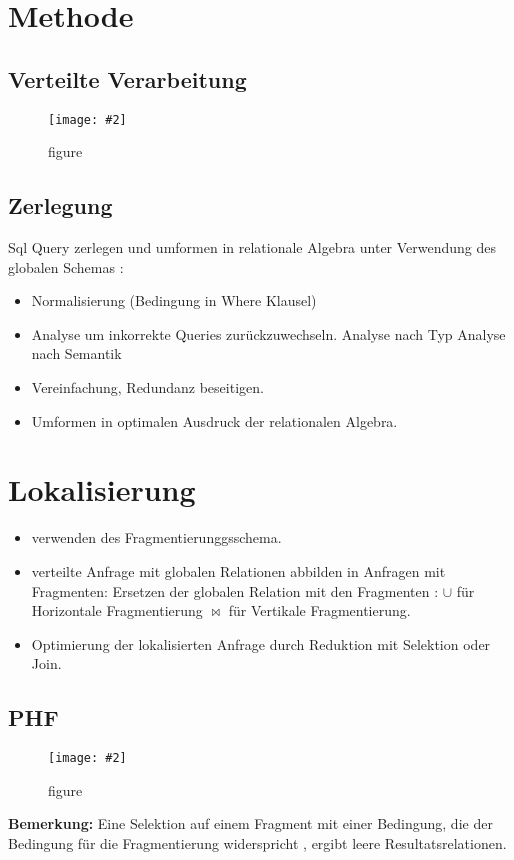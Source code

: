 \documentclass[a4paper,10pt,titlepage=false]{scrreprt}
\newcommand{\pic}[2][figure]{\begin{figure}[h]
 \centering
 \texttt{[image: \#2]}
 \caption{#1}
\end{figure}
}
\begin{document}
\section{Methode}
\subsection{Verteilte Verarbeitung}
\pic{vab}

\subsection{Zerlegung}
Sql Query zerlegen und umformen in relationale Algebra unter Verwendung des globalen Schemas :
\begin{itemize}
 \item Normalisierung (Bedingung in Where Klausel)
 \item Analyse um inkorrekte Queries zurückzuwechseln.
 \subitem Analyse nach Typ
 \subitem Analyse nach Semantik
 \item Vereinfachung, Redundanz beseitigen.
 \item Umformen in optimalen Ausdruck der relationalen Algebra.
 
\end{itemize}

\section{Lokalisierung}
\begin{itemize}
 \item verwenden des Fragmentierunggsschema.
 \item verteilte Anfrage mit globalen Relationen abbilden in Anfragen mit Fragmenten:
 \subitem Ersetzen der globalen Relation mit den Fragmenten :
 \subitem $\cup$ für Horizontale Fragmentierung
 \subitem $\bowtie$ für Vertikale Fragmentierung.
 \item Optimierung der lokalisierten Anfrage durch Reduktion mit Selektion oder Join.
\end{itemize}

\subsection{PHF}
\pic{phfr.png}
\textbf{Bemerkung:} Eine Selektion auf einem Fragment mit einer Bedingung, die der Bedingung für die Fragmentierung 
widerspricht , ergibt leere Resultatsrelationen.
\end{document}

